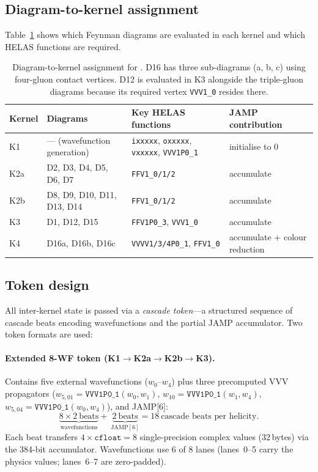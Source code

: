 \subsection{Diagram-to-kernel assignment}\label{sec:diagram_assign}

Table~\ref{tab:diag_assign} shows which Feynman diagrams are evaluated in each
kernel and which HELAS functions are required.

\begin{table}[h]
\caption{Diagram-to-kernel assignment for \ggttg.  D16 has three
sub-diagrams (a, b, c) using four-gluon contact vertices.  D12 is evaluated
in K3 alongside the triple-gluon diagrams because its required vertex
\texttt{VVV1\_0} resides there.}
\label{tab:diag_assign}
\begin{tabular}{@{}llll@{}}
\toprule
Kernel & Diagrams & Key HELAS functions & JAMP contribution \\
\midrule
K1 & --- (wavefunction generation) &
  \texttt{ixxxxx}, \texttt{oxxxxx}, \texttt{vxxxxx}, \texttt{VVV1P0\_1}
  & initialise to 0 \\
K2a & D2, D3, D4, D5, D6, D7 &
  \texttt{FFV1\_0/1/2}
  & accumulate \\
K2b & D8, D9, D10, D11, D13, D14 &
  \texttt{FFV1\_0/1/2}
  & accumulate \\
K3 & D1, D12, D15 &
  \texttt{FFV1P0\_3}, \texttt{VVV1\_0}
  & accumulate \\
K4 & D16a, D16b, D16c &
  \texttt{VVVV1/3/4P0\_1}, \texttt{FFV1\_0}
  & accumulate + colour reduction \\
\bottomrule
\end{tabular}
\end{table}

\subsection{Token design}\label{sec:token}

All inter-kernel state is passed via a \emph{cascade token}---a structured
sequence of cascade beats encoding wavefunctions and the partial JAMP
accumulator.  Two token formats are used:

\paragraph{Extended 8-WF token (K1$\to$K2a$\to$K2b$\to$K3).}
Contains five external wavefunctions ($w_0$--$w_4$) plus three precomputed VVV
propagators ($w_{5,01} = \texttt{VVV1P0\_1}(w_0,w_1)$,
$w_{10} = \texttt{VVV1P0\_1}(w_1,w_4)$,
$w_{5,04} = \texttt{VVV1P0\_1}(w_0,w_4)$), and JAMP[6]:
\begin{equation}
  \underbrace{8 \times 2\ \text{beats}}_{\text{wavefunctions}}
  +\ \underbrace{2\ \text{beats}}_{\text{JAMP}[6]}
  = 18\ \text{cascade beats per helicity}.
  \label{eq:extended_token}
\end{equation}
Each beat transfers $4\times\texttt{cfloat} = 8$ single-precision complex
values (32\,bytes) via the 384-bit accumulator.  Wavefunctions use 6 of 8
lanes (lanes~0--5 carry the physics values; lanes~6--7 are zero-padded).

